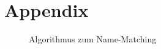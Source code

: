 \chapter{Appendix}

\begin{figure}
    
    \caption{Algorithmus zum Name-Matching}
    \label{lst:name_matching}
\end{figure}